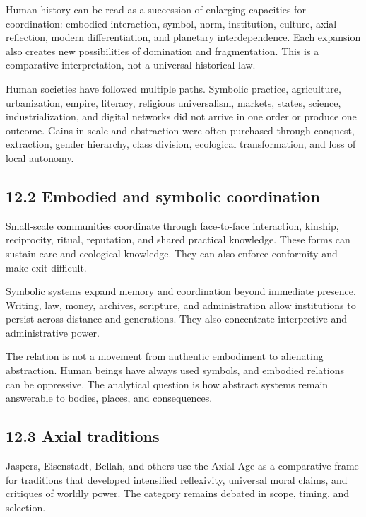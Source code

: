 \documentclass[
  11pt,
]{article}
\begin{document}
Human history can be read as a succession of enlarging capacities for
coordination: embodied interaction, symbol, norm, institution, culture,
axial reflection, modern differentiation, and planetary interdependence.
Each expansion also creates new possibilities of domination and
fragmentation. This is a comparative interpretation, not a universal
historical law.

Human societies have followed multiple paths. Symbolic practice,
agriculture, urbanization, empire, literacy, religious universalism,
markets, states, science, industrialization, and digital networks did
not arrive in one order or produce one outcome. Gains in scale and
abstraction were often purchased through conquest, extraction, gender
hierarchy, class division, ecological transformation, and loss of local
autonomy.

\subsection{12.2 Embodied and symbolic
coordination}\label{embodied-and-symbolic-coordination}

Small-scale communities coordinate through face-to-face interaction,
kinship, reciprocity, ritual, reputation, and shared practical
knowledge. These forms can sustain care and ecological knowledge. They
can also enforce conformity and make exit difficult.

Symbolic systems expand memory and coordination beyond immediate
presence. Writing, law, money, archives, scripture, and administration
allow institutions to persist across distance and generations. They also
concentrate interpretive and administrative power.

The relation is not a movement from authentic embodiment to alienating
abstraction. Human beings have always used symbols, and embodied
relations can be oppressive. The analytical question is how abstract
systems remain answerable to bodies, places, and consequences.

\subsection{12.3 Axial traditions}\label{axial-traditions}

Jaspers, Eisenstadt, Bellah, and others use the Axial Age as a
comparative frame for traditions that developed intensified reflexivity,
universal moral claims, and critiques of worldly power. The category
remains debated in scope, timing, and selection.
\end{document}

